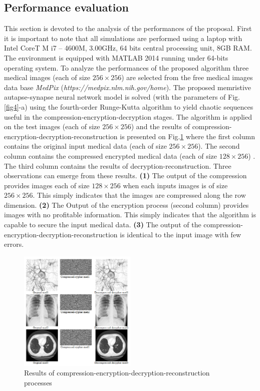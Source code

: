 \documentclass[journal]{IEEEtran/IEEEtran}
\begin{document}
\subsection{Performance evaluation}
This section is devoted to the analysis of the performances of the proposal. First it is important to note that all simulations are performed using a laptop with Intel CoreT M i7 – 4600M, 3.00GHz, 64 bits central processing unit, 8GB RAM. The environment is equipped with MATLAB 2014 running under 64-bits operating system. To analyze the performances of the proposed algorithm three medical images (each of size  $256 \times 256$) are selected from the free medical images data base \textit{MedPix} (\textit{https://medpix.nlm.nih.gov/home}). The proposed memristive autapse-synapse neural network  model is solved (with the parameters of Fig.\ref{fig4}-a) using the fourth-order Runge-Kutta algorithm to yield chaotic sequences useful in the compression-encryption-decryption stages. The algorithm is applied on the test images (each of size  $256 \times 256$) and the results of compression-encryption-decryption-reconstruction is presented on Fig.\ref{fig6} where the first column contains the original input medical data (each of size  $256 \times 256$). The second column contains the compressed encrypted medical data (each of size  $128 \times 256$) . The third column contains the results of decryption-reconstruction. Three observations can emerge from these results. \textbf{(1)} The output of the compression provides images each of size $128 \times 256$ when each inputs images is of size  $256 \times 256$. This simply indicates that the images are compressed along the row dimension. \textbf{(2)} The Output of the encryption process (second column) provides images with no profitable information. This simply indicates that the algorithm is capable to secure the input medical data. \textbf{(3)} The output of the compression-encryption-decryption-reconstruction is identical to the input image with few errors.


\begin{figure}[!t]
	\centering
	\includegraphics[width=0.5\textwidth]{fig6.png}
		\caption{Results of compression-encryption-decryption-reconstruction processes}
	\label{fig6}
\end{figure}
 
\end{document}

